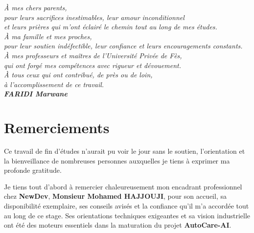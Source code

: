 \documentclass[12pt,a4paper,twoside,openright]{report}
\begin{document}
  \vspace{1cm}
  \begin{flushright}
    \itshape
    \`A mes chers parents,\\
    pour leurs sacrifices inestimables, leur amour inconditionnel\\
    et leurs pri\`eres qui m'ont \'eclair\'e le chemin tout au long de mes \'etudes.\\[0.8cm]
    
    \`A ma famille et mes proches,\\
    pour leur soutien ind\'efectible, leur confiance et leurs encouragements constants.\\[0.8cm]
    
    \`A mes professeurs et ma\^itres de l'Universit\'e Priv\'ee de F\`es,\\
    qui ont forg\'e mes comp\'etences avec rigueur et d\'evouement.\\[0.8cm]
    
    \`A tous ceux qui ont contribu\'e, de pr\`es ou de loin,\\
    \`a l'accomplissement de ce travail.\\
    
    \vspace{1cm}
    \textbf{FARIDI Marwane}
  \end{flushright}

  \newpage

  \chapter*{Remerciements}

  Ce travail de fin d'\'etudes n'aurait pu voir le jour sans le soutien, l'orientation et la bienveillance de nombreuses personnes auxquelles je tiens \`a exprimer ma profonde gratitude.

  Je tiens tout d'abord \`a remercier chaleureusement mon encadrant professionnel chez \textbf{NewDev}, \textbf{Monsieur Mohamed HAJJOUJI}, pour son accueil, sa disponibilit\'e exemplaire, ses conseils avis\'es et la confiance qu'il m'a accord\'ee tout au long de ce stage. Ses orientations techniques exigeantes et sa vision industrielle ont \'et\'e des moteurs essentiels dans la maturation du projet \textbf{AutoCare-AI}.
\end{document}
